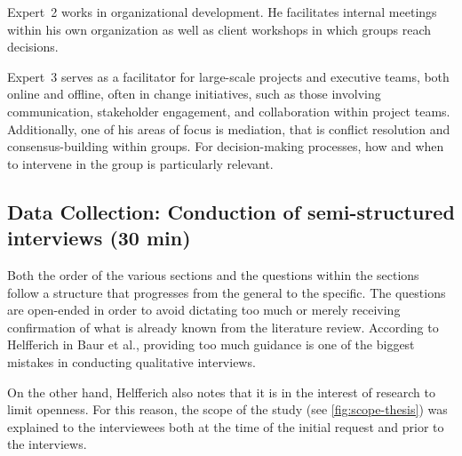Expert~2 works in organizational development. He facilitates internal meetings within his own organization as
well as client workshops in which groups reach decisions.

Expert~3 serves as a facilitator for large-scale projects and executive teams, both online and offline, often
in change initiatives, such as those involving communication, stakeholder engagement, and collaboration within
project teams. Additionally, one of his areas of focus is mediation, that is conflict resolution and
consensus-building within groups. For decision-making processes, how and when to intervene in the group is
particularly relevant.

\subsection{Data Collection: Conduction of semi-structured interviews (30 min)}

Both the order of the various sections and the questions within the sections follow a structure that
progresses from the general to the specific. The questions are open-ended in order to avoid dictating too
much or merely receiving confirmation of what is already known from the literature review. According to
Helfferich in Baur et al., providing too much guidance is one of the biggest mistakes in conducting
qualitative interviews. \cite[p. 878]{baurHandbuchMethodenEmpirischen2022}

On the other hand, Helfferich also notes that it is in the interest of research to limit openness. \cite[p.
878f.]{baurHandbuchMethodenEmpirischen2022} For this reason, the scope of the study (see
\autoref{fig:scope-thesis}) was explained to the interviewees both at the time of the initial request and
prior to the interviews.

